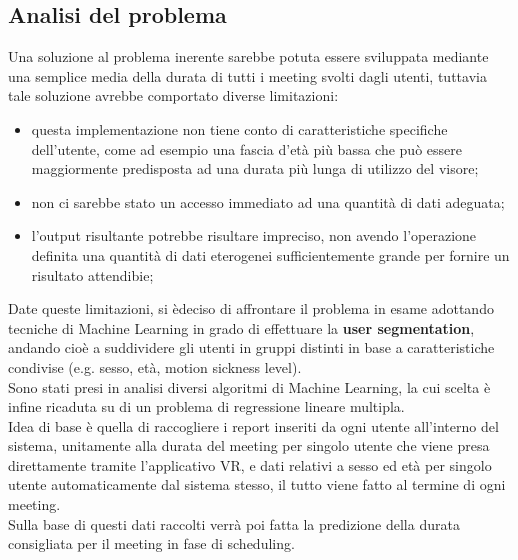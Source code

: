 \subsection{Analisi del problema}
\fancyhead{}    %
\par{
Una soluzione al problema inerente sarebbe potuta essere sviluppata mediante una semplice media della durata di tutti i meeting svolti dagli utenti, tuttavia tale soluzione avrebbe comportato diverse limitazioni:
\begin{itemize}
    \item questa implementazione non tiene conto di caratteristiche specifiche dell'utente, come ad esempio una fascia d'età più bassa che può essere maggiormente predisposta ad una durata più lunga di utilizzo del visore;
    \item non ci sarebbe stato un accesso immediato ad una quantità di dati adeguata;
    \item l'output risultante potrebbe risultare impreciso, non avendo l'operazione definita una quantità di dati eterogenei sufficientemente grande per fornire un risultato attendibie;
\end{itemize}
Date queste limitazioni, si èdeciso di affrontare il problema in esame adottando tecniche di Machine Learning in grado di effettuare la \textbf{user segmentation}, andando cioè a suddividere gli utenti in gruppi distinti in base a caratteristiche condivise (e.g. sesso, età, motion sickness level).\\
Sono stati presi in analisi diversi algoritmi di Machine Learning, la cui scelta è infine ricaduta su di un problema di regressione lineare multipla.\\
Idea di base è quella di raccogliere i report inseriti da ogni utente all'interno del sistema, unitamente alla durata del meeting per singolo utente che viene presa direttamente tramite l'applicativo VR, e dati relativi a sesso ed età per singolo utente automaticamente dal sistema stesso, il tutto viene fatto al termine di ogni meeting.\\
Sulla base di questi dati raccolti verrà poi fatta la predizione della durata consigliata per il meeting in fase di scheduling.
}